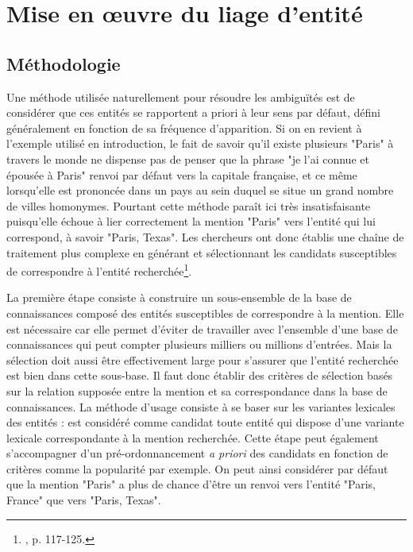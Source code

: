 \documentclass[a4paper,12pt,twoside]{book}
\begin{document}
	
	\section{Mise en œuvre du liage d'entité}
	
	\subsection{Méthodologie}
	
	Une méthode utilisée naturellement pour résoudre les ambiguïtés est de considérer que ces entités se rapportent a priori à leur sens par défaut, défini généralement en fonction de sa fréquence d'apparition. Si on en revient à l'exemple utilisé en introduction, le fait de savoir qu'il existe plusieurs "Paris" à travers le monde ne dispense pas de penser que la phrase "je l’ai connue et épousée à Paris" renvoi par défaut vers la capitale française, et ce même lorsqu'elle est prononcée dans un pays au sein duquel se situe un grand nombre de villes homonymes. Pourtant cette méthode paraît ici très insatisfaisante puisqu'elle échoue à lier correctement la mention "Paris" vers l'entité qui lui correspond, à savoir "Paris, Texas". Les chercheurs ont donc établis une chaîne de traitement plus complexe en générant et sélectionnant les candidats susceptibles de correspondre à l'entité recherchée\footnote{\cite{stern_identification_2013}, p. 117-125.}.
	
	La première étape consiste à construire un sous-ensemble de la base de connaissances composé des entités susceptibles de correspondre à la mention. Elle est nécessaire car elle permet d'éviter de travailler avec l'ensemble d'une base de connaissances qui peut compter plusieurs milliers ou millions d'entrées. Mais la sélection doit aussi être effectivement large pour s'assurer que l'entité recherchée est bien dans cette sous-base. Il faut donc établir des critères de sélection basés sur la relation supposée entre la mention et sa correspondance dans la base de connaissances. La méthode d'usage consiste à se baser sur les variantes lexicales des entités : est considéré comme candidat toute entité qui dispose d'une variante lexicale correspondante à la mention recherchée. Cette étape peut également s'accompagner d'un pré-ordonnancement \textit{a priori} des candidats en fonction de critères comme la popularité par exemple. On peut ainsi considérer par défaut que la mention "Paris" a plus de chance d'être un renvoi vers l'entité "Paris, France" que vers "Paris, Texas".
	
\end{document}
